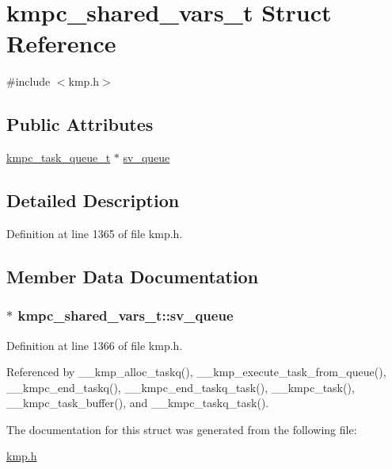 \hypertarget{structkmpc__shared__vars__t}{\section{kmpc\-\_\-shared\-\_\-vars\-\_\-t Struct Reference}
\label{structkmpc__shared__vars__t}
}


{\ttfamily \#include $<$kmp.\-h$>$}

\subsection*{Public Attributes}
\begin{DoxyCompactItemize}
\item 
\hyperlink{structkmpc__task__queue__t}{kmpc\-\_\-task\-\_\-queue\-\_\-t} $\ast$ \hyperlink{structkmpc__shared__vars__t_a580f7b543bc8146cfbb25b5283e5d487}{sv\-\_\-queue}
\end{DoxyCompactItemize}


\subsection{Detailed Description}


Definition at line 1365 of file kmp.\-h.



\subsection{Member Data Documentation}
\hypertarget{structkmpc__shared__vars__t_a580f7b543bc8146cfbb25b5283e5d487}{
\subsubsection[{sv\-\_\-queue}]{$\ast$ kmpc\-\_\-shared\-\_\-vars\-\_\-t\-::sv\-\_\-queue}}\label{structkmpc__shared__vars__t_a580f7b543bc8146cfbb25b5283e5d487}


Definition at line 1366 of file kmp.\-h.



Referenced by \-\_\-\-\_\-kmp\-\_\-alloc\-\_\-taskq(), \-\_\-\-\_\-kmp\-\_\-execute\-\_\-task\-\_\-from\-\_\-queue(), \-\_\-\-\_\-kmpc\-\_\-end\-\_\-taskq(), \-\_\-\-\_\-kmpc\-\_\-end\-\_\-taskq\-\_\-task(), \-\_\-\-\_\-kmpc\-\_\-task(), \-\_\-\-\_\-kmpc\-\_\-task\-\_\-buffer(), and \-\_\-\-\_\-kmpc\-\_\-taskq\-\_\-task().



The documentation for this struct was generated from the following file\-:\begin{DoxyCompactItemize}
\item 
\hyperlink{kmp_8h}{kmp.\-h}\end{DoxyCompactItemize}
